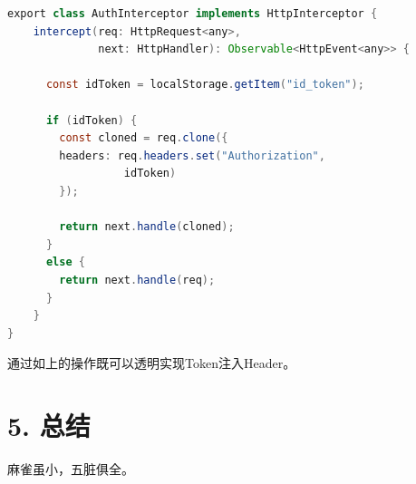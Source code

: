 \documentclass[a4paper,12pt, centering]{ctexart}
\begin{document}
  \begin{lstlisting}[language=java, caption=前端Header自动注入Token]
    export class AuthInterceptor implements HttpInterceptor {
    intercept(req: HttpRequest<any>,
              next: HttpHandler): Observable<HttpEvent<any>> {

      const idToken = localStorage.getItem("id_token");

      if (idToken) {
        const cloned = req.clone({
        headers: req.headers.set("Authorization",
                  idToken)
        });

        return next.handle(cloned);
      }
      else {
        return next.handle(req);
      }
    }
}
  \end{lstlisting}

  通过如上的操作既可以透明实现Token注入Header。

  \section*{5. 总结}

  麻雀虽小，五脏俱全。
\end{document}
